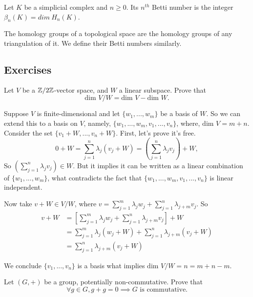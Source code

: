 \begin{definition}
    Let $K$ be a simplicial complex and $n \ge 0$. Its $n^{th}$ Betti number
    is the integer $\beta_n(K) = dim~ H_n(K)$.
\end{definition}

\begin{definition}
    The homology groups of a topological space are the homology groups of any triangulation of it. We define their Betti numbers similarly.
\end{definition}

\subsection{Exercises}

\begin{exercise}
    Let $V$ be a $\mathbb{Z}/2\mathbb{Z}$-vector space, and $W$ a linear subspace. Prove that
    $$\text{dim } V /W = \text{dim } V - \text{dim } W  .$$
\end{exercise}

Suppose $V$ is finite-dimensional and let $\{w_1, ..., w_m\}$ be a basis of
$W$. So we can extend this to a basis on $V$, namely, $\{w_1, ..., w_m, v_1,
..., v_{n}\}$, where, $\text{dim } V = m + n$. Consider the set $\{v_1 + W, ...,
v_n + W\}.$ First, let's prove it's free.
$$
0 + W = \sum_{j=1}^n \lambda_j(v_j + W) = \left(\sum_{j=1}^n \lambda_j v_j \right) + W, 
$$
So $\left(\sum_{j=1}^n \lambda_j v_j \right) \in W$. But it implies it can be
written as a linear combination of $\{w_1, ..., w_m\}$, what contradicts the
fact that $\{w_1, ..., w_m, v_1,
..., v_{n}\}$ is linear independent. 

Now take $v + W \in V/W$, where $v = \sum_{j=1}^m \lambda_j w_j + \sum_{j=1}^n
\lambda_{j+m} v_j$. So 
\begin{equation*}
    \begin{split}
        v + W &= \left[\sum_{j=1}^m \lambda_j w_j + \sum_{j=1}^n
        \lambda_{j+m} v_j\right] + W \\
        &= \sum_{j=1}^m \lambda_j (w_j + W) + \sum_{j=1}^n
        \lambda_{j+m} (v_j+ W) \\
        &= \sum_{j=1}^n
        \lambda_{j+m} (v_j+ W) 
    \end{split}
\end{equation*}

We conclude $\{v_1,
..., v_{n}\}$ is a basis what implies $\text{dim } V/W = n = m + n - m$. 


\begin{exercise}
    Let $(G, +)$ be a group, potentially non-commutative. Prove that
    $$\forall g \in G, g + g = 0 \implies G \text{ is commutative.}$$
\end{exercise}

